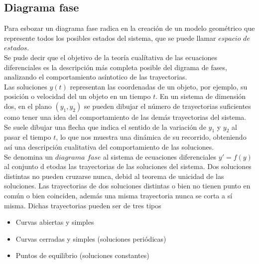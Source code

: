 \documentclass[10pt,a4paper,notitlepage]{report}
\begin{document}
\subsection*{Diagrama fase}
Para esbozar un diagrama fase radica en la creación de un modelo geométrico que represente todos los posibles estados del sistema, que se puede llamar $espacio$ $de$ $estados$.\\ Se pude decir que el objetivo de la teoría cualítativa de las ecuaciones diferenciales es la descripción más completa posible del digrama de fases, analizando el comportamiento asíntotico de las trayectorias.\\
 Las soluciones $y (t)$ representan las coordenadas de un objeto, por ejemplo, su posición o velocidad del un objeto en un tiempo $t$. En un sistema de dimensión dos, en el plano $(y_{1}, y_{2})$ se pueden dibujar el número de trayectorias suficientes como tener una idea del comportamiento de las demás trayectorias del sistema. Se suele dibujar una flecha que indica el sentido de la variación de $y_{1}$ y $y_{2}$ al pasar el tiempo $t$, lo que nos muestra una dinámica de su recorrido, obteniendo así una descripción cualitativa del comportamiento de las soluciones. \\
Se denomina un $diagrama$ $fase$ al sistema de ecuaciones diferenciales $y' = f(y)$ al conjunto d etodas las trayectorias de las soluciones del sistema. Dos soluciones distintas no pueden cruzarse nunca, debid al teorema de unicidad de las soluciones. Las trayectorias de dos soluciones distintas o bien no tienen punto en común o bien coinciden, además una misma trayectoria nunca se corta a sí misma.
Dichas trayectorias pueden ser de tres tipos
\begin{itemize}
\item Curvas abiertas y simples
\item Curvas cerradas y simples (soluciones periódicas)
\item Puntos de equilibrio (soluciones constantes)
\end{itemize}
\end{document}
